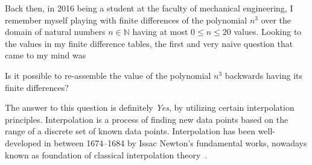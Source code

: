 Back then, in 2016 being a student at the faculty of mechanical engineering,
I remember myself playing with finite differences of the polynomial $n^3$ over the domain of natural numbers $n\in\mathbb{N}$
having at most $0 \leq n \leq 20$ values.
Looking to the values in my finite difference tables, the first and very naive question that came to my mind was
\begin{question}
    Is it possible to re-assemble the value of the polynomial $n^3$ backwards
    having its finite differences?
\end{question}
The answer to this question is definitely \textit{Yes}, by utilizing certain interpolation principles.
Interpolation is a process of finding new data points based on the range of a discrete set of known data points.
Interpolation has been well-developed in between 1674--1684
by Issac Newton's fundamental works, nowadays known as foundation of classical interpolation
theory~\cite{meijering2002chronology}.

